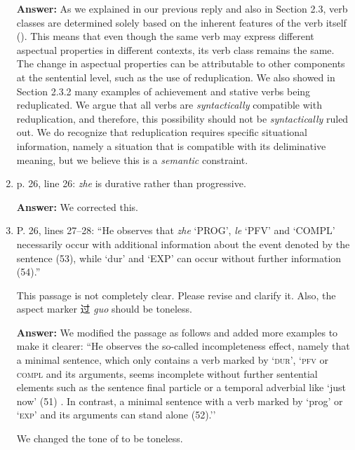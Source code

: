 \documentclass[fleqn,twoside]{article}
\begin{document}
\begin{enumerate}
\noindent
\textbf{Answer:} As we explained in our previous reply and also in Section 2.3, 
verb classes are determined solely based on 
the inherent features of the verb itself
(\citealt[52]{XiaoMcEnery2004}).
This means that even though the same verb may express different aspectual properties in different contexts,
its verb class remains the same.
The change in aspectual properties can be attributable to other components at the sentential level, such as the use of reduplication.
We also showed in Section 2.3.2 many examples of achievement and stative verbs being reduplicated.
We argue that all verbs are \textit{syntactically} compatible with reduplication, 
and therefore, this possibility should not be \textit{syntactically} ruled out.
We do recognize that reduplication requires specific situational information, 
namely a situation that is compatible with its deliminative meaning,
but we believe this is a \textit{semantic} constraint.


\item p. 26, line 26: \textit{zhe} is durative rather than progressive.


\noindent
\textbf{Answer:} We corrected this.

\item P. 26, lines 27--28: ``He observes that \textit{zhe} `PROG', \textit{le} `PFV' and  `COMPL' necessarily occur
with additional information about the event denoted by the sentence (53), while  `dur' and 
`EXP' can occur without further information (54).''

This passage is not completely clear. Please revise and clarify it. Also, the aspect marker 过 \textit{guo}
should be toneless.

\noindent
\textbf{Answer:} We modified the passage as follows and added more examples to make it clearer: 
``He observes the so-called incompleteness effect, namely that a minimal sentence, 
which only contains a verb marked by  `\textsc{dur}',
 `\textsc{pfv} or  \textsc{compl} 
and its arguments, 
seems incomplete without further sentential elements 
such as the sentence final particle  
or a temporal adverbial like  `just now' (51) . 
In contrast, a minimal sentence with a verb marked by   `prog' or 
`\textsc{exp}'  and its arguments can stand alone (52).''

We changed the tone of  to be toneless.



\end{enumerate}
\end{document}

